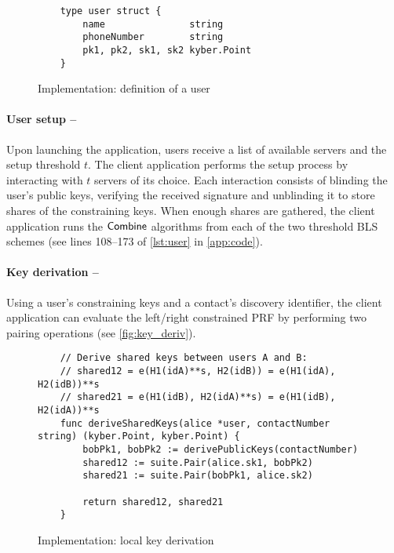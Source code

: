 	\begin{figure}[H]
	\begin{center}
		\begin{lstlisting}
	type user struct {
		name               string
		phoneNumber        string
		pk1, pk2, sk1, sk2 kyber.Point
	}
		\end{lstlisting}
	\caption{Implementation: definition of a user}
	\label{fig:user_def}
	\end{center}
\end{figure}


	\paragraph{User setup --} Upon launching the application, users receive a list of available servers and the setup threshold $t$. The client application performs the setup process by interacting with $t$ servers of its choice. Each interaction consists of blinding the user's public keys, verifying the received signature and unblinding it to store shares of the constraining keys. When enough shares are gathered, the client application runs the $\mathsf{Combine}$ algorithms from each of the two threshold BLS schemes (see lines 108--173 of \autoref{lst:user} in \autoref{app:code}).



	\paragraph{Key derivation --} Using a user's constraining keys and a contact's discovery identifier, the client application can evaluate the left/right constrained PRF by performing two pairing operations (see \autoref{fig:key_deriv}).
	
	\begin{figure}[H]
	\begin{center}
		\begin{lstlisting}
	// Derive shared keys between users A and B:
	// shared12 = e(H1(idA)**s, H2(idB)) = e(H1(idA), H2(idB))**s
	// shared21 = e(H1(idB), H2(idA)**s) = e(H1(idB), H2(idA))**s
	func deriveSharedKeys(alice *user, contactNumber string) (kyber.Point, kyber.Point) {
		bobPk1, bobPk2 := derivePublicKeys(contactNumber)
		shared12 := suite.Pair(alice.sk1, bobPk2)
		shared21 := suite.Pair(bobPk1, alice.sk2)
	
		return shared12, shared21
	}
		\end{lstlisting}
	\caption{Implementation: local key derivation}
	\label{fig:key_deriv}
	\end{center}
\end{figure}



